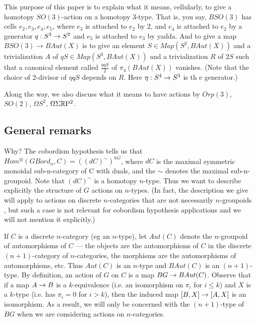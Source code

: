 \documentclass{amsart}
\begin{document}
This purpose of this paper is to explain what it means, cellularly, to give a homotopy $SO(3)$-action on a homotopy 3-type.  That is, you say, $BSO(3)$ has cells $e_2, e_3, e_4, e_5$, where $e_3$ is attached to $e_2$ by $2$, and $e_4$ is attached to $e_2$ by a generator $q: S^3 \rightarrow S^2$ and $e_5$ is attached to $e_3$ by yadda.  And to give a map $BSO(3) \rightarrow BAut(X)$ is to give an element $S \in Map(S^2,BAut(X))$ and a trivialization $A$ of $q S \in Map(S^3,BAut(X))$ and a trivialization $R$ of $2S$ such that a canonical element called $\frac{\eta q S}{2}$ of $\pi_4(BAut(X))$ vanishes.  (Note that the choice of 2-divisor of $\eta q S$ depends on $R$.  Here $\eta: S^4 \rightarrow S^3$ is th 	e generator.)

Along the way, we also discuss what it means to have actions by $Orp(3)$, $SO(2)$, $\Omega S^2$, $\Omega \Sigma \mathbb R \mathrm{P}^2$.


\subsection{General remarks}

Why? The cobordism hypothesis tells us that $Hom^{\otimes}(GBord_n,C) = ((dC)^{\sim})^{hG}$, where $dC$ is the maximal symmetric monoidal sub-n-category of C with duals, and the $\sim$ denotes the maximal sub-n-groupoid.  Note that $(dC)^\sim$ is a homotopy $n$-type.  Thus we want to describe explicitly the structure of $G$ actions on $n$-types.  (In fact, the description we give will apply to actions on discrete $n$-categories that are not necessarily $n$-groupoids , but such a case is not relevant for cobordism hypothesis applications and we will not mention it explicitly.)

If $C$ is a discrete $n$-category (eg an $n$-type), let $Aut(C)$ denote the $n$-groupoid of automorphisms of $C$ --- the objects are the automorphisms of $C$ in the discrete $(n+1)$-category of $n$-categories, the morphisms are the automorphisms of automorphisms, etc.  Thus $Aut(C)$ is an $n$-type and $BAut(C)$ is an $(n+1)$-type.  By definition, an action of $G$ on $C$ is a map $BG \rightarrow BAut(C)$.  Observe that if a map $A \rightarrow B$ is a $k$-equivalence (i.e. an isomorphism on $\pi_i$ for $i \leq k$) and $X$ is a $k$-type (i.e. has $\pi_i = 0$ for $i > k$), then the induced map $[B,X] \rightarrow [A,X]$ is an isomorphism.  As a result, we will only be concerned with the $(n+1)$-type of $BG$ when we are considering actions on $n$-categories.
\end{document}
